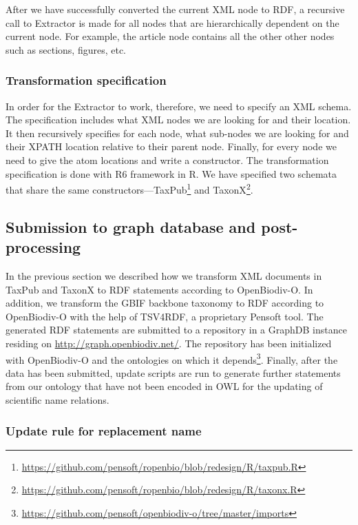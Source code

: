 After we have successfully converted the current XML node to RDF, a recursive call to Extractor is made for all nodes that are hierarchically dependent on the current node. For example, the article node contains all the other other nodes such as sections, figures, etc.

\subsubsection{Transformation specification}

In order for the Extractor to work, therefore, we need to specify an XML schema. The specification includes what XML nodes we are looking for and their location. It then recursively specifies for each node, what sub-nodes we are looking for and their XPATH location relative to their parent node. Finally, for every node we need to give the atom locations and write a constructor. The transformation specification is done with R6 framework in R. We have specified two schemata that share the same constructors---TaxPub\footnote{\url{https://github.com/pensoft/ropenbio/blob/redesign/R/taxpub.R}} and TaxonX\footnote{\url{https://github.com/pensoft/ropenbio/blob/redesign/R/taxonx.R}}.

\subsection{Submission to graph database and post-processing}

In the previous section we described how we transform XML documents in TaxPub and TaxonX to RDF statements according to OpenBiodiv-O. In addition, we transform the GBIF backbone taxonomy to RDF according to OpenBiodiv-O with the help of TSV4RDF, a proprietary Pensoft tool. The generated RDF statements are submitted to a repository in a GraphDB instance residing on \url{http://graph.openbiodiv.net/}. The repository has been initialized with OpenBiodiv-O and the ontologies on which it depends\footnote{\url{https://github.com/pensoft/openbiodiv-o/tree/master/imports}}. Finally, after the data has been submitted, update scripts are run to generate further statements from our ontology that have not been encoded in OWL for the updating of scientific name relations.

\subsubsection{Update rule for replacement name}

